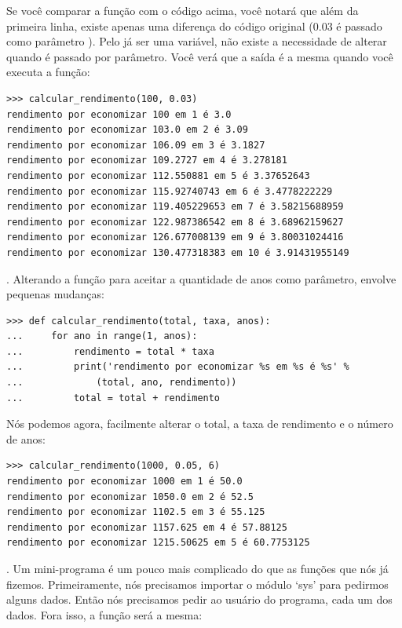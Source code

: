 Se você comparar a função com o código acima, você notará que além da primeira linha, existe apenas uma diferença do código original (0.03 é passado como parâmetro ). Pelo  já ser uma variável, não existe a necessidade de alterar quando é passado por parâmetro. Você verá que a saída é a mesma quando você executa a função:

\begin{listing}
\begin{verbatim}
>>> calcular_rendimento(100, 0.03)
rendimento por economizar 100 em 1 é 3.0
rendimento por economizar 103.0 em 2 é 3.09
rendimento por economizar 106.09 em 3 é 3.1827
rendimento por economizar 109.2727 em 4 é 3.278181
rendimento por economizar 112.550881 em 5 é 3.37652643
rendimento por economizar 115.92740743 em 6 é 3.4778222229
rendimento por economizar 119.405229653 em 7 é 3.58215688959
rendimento por economizar 122.987386542 em 8 é 3.68962159627
rendimento por economizar 126.677008139 em 9 é 3.80031024416
rendimento por economizar 130.477318383 em 10 é 3.91431955149
\end{verbatim}
\end{listing}

. Alterando a função para aceitar a quantidade de anos como parâmetro, envolve pequenas mudanças:

\begin{listing}
\begin{verbatim}
>>> def calcular_rendimento(total, taxa, anos):
...     for ano in range(1, anos):
...         rendimento = total * taxa
...         print('rendimento por economizar %s em %s é %s' %
...             (total, ano, rendimento))
...         total = total + rendimento
\end{verbatim}
\end{listing}

\noindent
Nós podemos agora, facilmente alterar o total, a taxa de rendimento e o número de anos:

\begin{listing}
\begin{verbatim}
>>> calcular_rendimento(1000, 0.05, 6)
rendimento por economizar 1000 em 1 é 50.0
rendimento por economizar 1050.0 em 2 é 52.5
rendimento por economizar 1102.5 em 3 é 55.125
rendimento por economizar 1157.625 em 4 é 57.88125
rendimento por economizar 1215.50625 em 5 é 60.7753125
\end{verbatim}
\end{listing}

. Um mini-programa é um pouco mais complicado do que as funções que nós já fizemos. Primeiramente, nós precisamos importar o módulo `sys' para pedirmos alguns dados. Então nós precisamos pedir ao usuário do programa, cada um dos dados. Fora isso, a função será a mesma:

